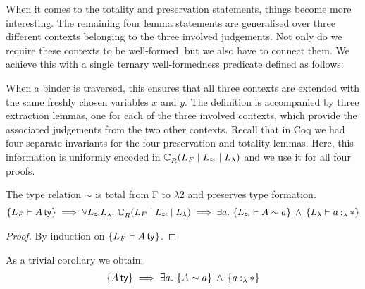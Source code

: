\documentclass[a4paper,UKenglish]{lipics-v2016}
\newcommand{\ms}{\,}
\newcommand{\mrel}[1]{\mathrel{\ms #1 \ms}}
\newcommand{\mAnd}{\mrel{\wedge}}
\newcommand{\mAll}[1]{\ensuremath{\forall} #1.\ms\ms}
\newcommand{\mEx}[1]{\ensuremath{\exists} #1.\ms\ms}
\newcommand{\SysL}{$\lambda$2\xspace}
\newcommand{\istyFh}[1]{\ensuremath{#1\ms\mathsf{ty}}}
\newcommand{\typingFh}[2]{\ensuremath{#1 \mathbin{:_{F}} #2}}
\newcommand{\typingLh}[2]{\ensuremath{#1 \mathbin{:_{\lambda}} #2}}
\newcommand{\tyr}{\mathrel{\sim}}
\newcommand{\tmr}{\mathrel{\approx}}
\newcommand{\Prp}{\ensuremath{\textrm{\textasteriskcentered}}}
\newcommand{\emptyctx}{\ensuremath{\bullet}}
\theoremstyle{plain}
\begin{document}
When it comes to the totality and preservation statements, things become more interesting.
The remaining four lemma statements are generalised over three different contexts belonging to the three involved judgements.
Not only do we require these contexts to be well-formed, but we also have to connect them.
We achieve this with a single ternary well-formedness predicate defined as follows:
\newcommand{\acR}[3]{\ac{R}{~}{#1 \mid #2 \mid #3}}
{\small
{}
}
When a binder is traversed, this ensures that all three contexts are extended with the same freshly chosen variables $x$ and $y$.
The definition is accompanied by three extraction lemmas, one for each of the three involved contexts, which provide the associated judgements from the two other contexts.
Recall that in Coq we had four separate invariants for the four preservation and totality lemmas.
Here, this information is uniformly encoded in $\acR{L_{F}}{L_{\tmr}}{L_{\lambda}}$ and we use it for all four proofs.
\begin{lemma} The type relation $\tyr$ is total from F to \SysL and preserves type formation.
  \begin{align*}
    \aj{L_{F}}{\istyFh{A}} \implies \mAll{L_{\tmr}L_{\lambda}} \acR{L_{F}}{L_{\tmr}}{L_{\lambda}} \implies \mEx{a} \aj{L_{\tmr}}{A \tyr a} \mAnd \aj{L_{\lambda}}{\typingLh{a}{\Prp}}
\end{align*}
\end{lemma}
\begin{proof}
  By induction on $\aj{L_{F}}{\istyFh{A}}$.
\end{proof}
As a trivial corollary we obtain:
\begin{align*}
  \aje{\istyFh{A}} \implies \mEx{a} \aje{A \tyr a} \mAnd \aje{\typingLh{a}{\Prp}}
\end{align*}
\end{document}

